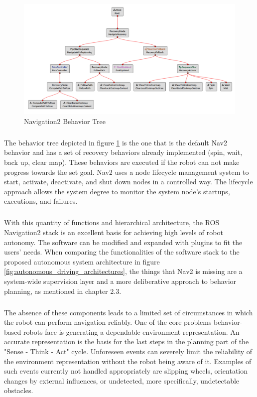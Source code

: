 \begin{figure}[ht]
	\label{fig:bt_nav}
	\includegraphics[width=1.0\textwidth]{images/nav_bt-modified.png}
	\caption{Navigation2 Behavior Tree}
\end{figure}
\subparagraph*{}
The behavior tree depicted in figure \ref{fig:bt_nav} is the one that is the default Nav2 behavior and has a set of recovery behaviors already implemented (spin, wait, back up, clear map). These behaviors are executed if the robot can not make progress towards the set goal. 
Nav2 uses a node lifecycle management system to start, activate, deactivate, and shut down nodes in a controlled way. The lifecycle approach allows the system degree to monitor the system node's startups, executions, and failures. 
\subparagraph*{}
With this quantity of functions and hierarchical architecture, the ROS Navigation2 stack is an excellent basis for achieving high levels of robot autonomy. The software can be modified and expanded with plugins to fit the users' needs. 
When comparing the functionalities of the software stack to the proposed autonomous system architecture in figure \ref{fig:autonomous_driving_architectures}, the things that Nav2 is missing are a system-wide supervision layer and a more deliberative approach to behavior planning, as mentioned in chapter 2.3.
\subparagraph*{}
The absence of these components leads to a limited set of circumstances in which the robot can perform navigation reliably. One of the core problems behavior-based robots face is generating a dependable environment representation. An accurate representation is the basis for the last steps in the planning part of the "Sense - Think - Act" cycle. Unforeseen events can severely limit the reliability of the environment representation without the robot being aware of it. Examples of such events currently not handled appropriately are slipping wheels, orientation changes by external influences, or undetected, more specifically, undetectable obstacles. 
